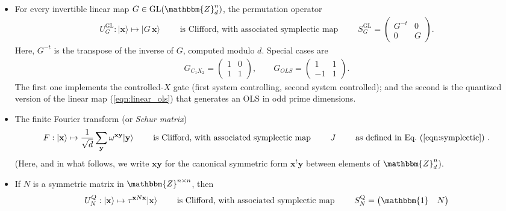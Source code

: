 \documentclass[aps,nofootinbib,floatfix,a4paper]{revtex4}
\newcommand{\1}{\mbox{$\mathbf{1}$}}
\def\ZZ{\mathbbm{Z}}
\def\Id{\mathbbm{1}}
\DeclareMathOperator{\GL}{GL}
\renewcommand{\vec}{\mathbf}
\begin{document}
	\begin{itemize}
		\item
			For every invertible linear map $G\in \GL(\ZZ_d^n)$, the permutation operator
			\begin{align*}
				U_G^{\GL}: 
				|\vec x\rangle \mapsto |G\,\vec x\rangle
				\qquad\text{ is Clifford, with associated symplectic map } \qquad
				S^{\operatorname{GL}}_G
				=
				\begin{pmatrix}
					G^{-t} & 0 \\
					0 & G
				\end{pmatrix}.
			\end{align*}
			Here, $G^{-t}$ is the transpose of the inverse of $G$, computed modulo $d$.
			Special cases are
			\begin{align*}
				G_{C_1X_2}=
				\begin{pmatrix}
					1 & 0 \\
					1 & 1
				\end{pmatrix},
				\qquad
				G_{OLS}=
				\begin{pmatrix}
					1  & 1 \\
					-1 & 1
				\end{pmatrix}.
			\end{align*}
			The first one implements the controlled-$X$ gate (first system controlling, second system controlled);
			and the second is the quantized version of the linear map (\ref{eqn:linear_ols}) that generates an OLS in odd prime dimensions.
		\item
			The finite Fourier transform (or \emph{Schur matrix}) 
			\begin{align}\label{eqn:schur}
				F:
				|\vec x\rangle
				\mapsto
				\frac1{\sqrt d}
				\sum_{\vec y} 
				\omega^{\vec x \vec y}|\vec y\rangle
				\qquad
				\text{ is Clifford, with associated symplectic map }
				\qquad
				J
				\qquad \text{ as defined in Eq.~(\ref{eqn:symplectic}) }
				.
			\end{align}
			(Here, and in what follows, we write $\vec x \vec y$ for the canonical symmetric form $\vec x^t \vec y$ between elements of $\ZZ_d^n$).
		\item
			If $N$ is a symmetric matrix in $\ZZ^{n \times n}$, 
			then
			\begin{align}\label{eqn:phase_gates}
				U_N^Q: 
				|\vec x\rangle \mapsto \tau^{\vec x N \vec x} |\vec x\rangle
				\qquad\text{ is Clifford, with associated symplectic map } \qquad
				S^{\operatorname{Q}}_N 
				=
				\begin{pmatrix}
					\Id & N \\

\end{pmatrix}
\end{align}
\end{itemize}
\end{document}
